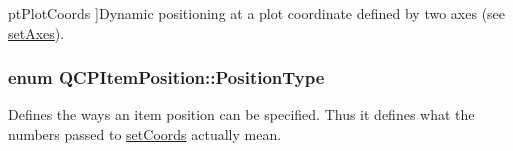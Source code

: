 \begin{Desc}
\begin{description}
{pt\+Plot\+Coords\hypertarget{class_q_c_p_item_position_aad9936c22bf43e3d358552f6e86dbdc8ae797603bd91e9561c0f2da044a30e5c6}{}\label{class_q_c_p_item_position_aad9936c22bf43e3d358552f6e86dbdc8ae797603bd91e9561c0f2da044a30e5c6}
}]Dynamic positioning at a plot coordinate defined by two axes (see \hyperlink{class_q_c_p_item_position_a2185f45c75ac8cb9be89daeaaad50e37}{set\+Axes}). \end{description}
\end{Desc}
\subsubsection[{\texorpdfstring{Position\+Type}{PositionType}}]{\setlength{\rightskip}{0pt plus 5cm}enum {\bf Q\+C\+P\+Item\+Position\+::\+Position\+Type}}\hypertarget{class_q_c_p_item_position_aad9936c22bf43e3d358552f6e86dbdc8}{}\label{class_q_c_p_item_position_aad9936c22bf43e3d358552f6e86dbdc8}
Defines the ways an item position can be specified. Thus it defines what the numbers passed to \hyperlink{class_q_c_p_item_position_aa988ba4e87ab684c9021017dcaba945f}{set\+Coords} actually mean.

